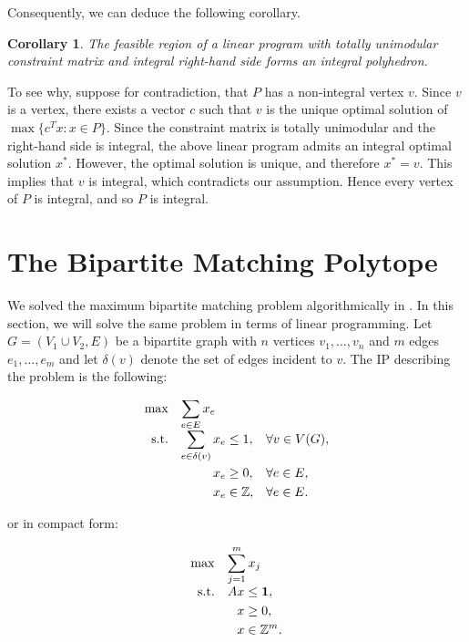 \documentclass[12pt]{report}
\newtheorem{ccor}[base]{Corollary}
\numberwithin{algorithm}{chapter}
\begin{document}
	Consequently, we can deduce the following corollary.
	
	\begin{ccor} \label{IntPolyTU}
		The feasible region of a linear program with totally unimodular constraint matrix and integral right-hand side forms an integral polyhedron.
	\end{ccor}
	
	To see why, suppose for contradiction, that $P$ has a non-integral vertex $v$. Since $v$ is a vertex, there exists a vector $c$ such that $v$ is the unique optimal solution of $\max\{c^Tx : x\in P\}$. Since the constraint matrix is totally unimodular and the right-hand side is integral, the above linear program admits an integral optimal solution $x^*$. However, the optimal solution is unique, and therefore $x^*=v$. This implies that $v$ is integral, which contradicts our assumption. Hence every vertex of $P$ is integral, and so $P$ is integral.
	

\section{The Bipartite Matching Polytope}

	We solved the maximum bipartite matching problem algorithmically  in . In this section, we will solve the same problem in terms of linear programming. Let $G = (V_{1} \cup V_{2}, E)$ be a bipartite graph with $n$ vertices $v_{1}, \ldots, v_{n}$ and $m$ edges $e_{1}, \ldots, e_{m}$ and let $\delta(v)$ denote the set of edges incident to $v$. The IP describing the problem is the following:
	
	\begin{equation}
		\label{matching-ip}
		\begin{array}{r@{\quad}l}
			\max & \displaystyle\sum_{e\in E} x_e \\[2mm]
			\text{s.t.} &
			\begin{aligned}[t]
				\displaystyle\sum_{e\in \delta(v)} x_e &\leq 1,
				&& \forall v\in V(G),\\
				x_e &\geq 0,
				&& \forall e\in E,\\
				x_e &\in \mathbb{Z},
				&& \forall e\in E.
			\end{aligned}
		\end{array}
	\end{equation}
	
	or in compact form:
	
	\begin{equation}
		\label{mbm-compact}
		\begin{array}{r@{\quad}l}
			\max & \displaystyle\sum_{j=1}^{m} x_j \\[2mm]
			\text{s.t.} &
			\begin{aligned}[t]
				Ax &\leq \mathbf{1},\\
				x &\geq 0,\\
				x &\in \mathbb{Z}^{m}.
			\end{aligned}
		\end{array}
	\end{equation}	
	
\end{document}
